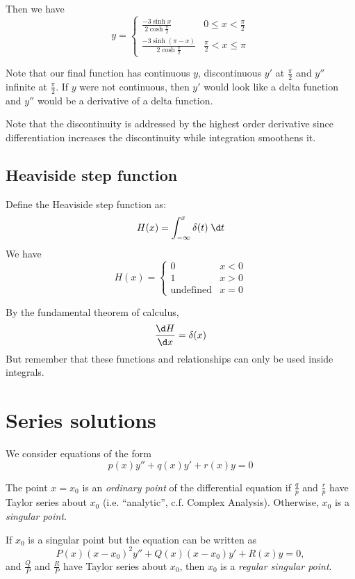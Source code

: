 \documentclass[a4paper]{article}
\begin{document}
Then we have 
\[
y =
\begin{cases}
  \frac{-3\sinh x}{2\cosh \frac{\pi}{2}} & 0 \leq x < \frac{\pi}{2}\\
  \frac{-3\sinh(\pi - x)}{2\cosh \frac{\pi}{2}} & \frac{\pi}{2} < x \leq \pi
\end{cases}
\]

Note that our final function has continuous $y$, discontinuous $y'$ at $\frac{\pi}{2}$ and $y''$ infinite at $\frac{\pi}{2}$. If $y$ were not continuous, then $y'$ would look like a delta function and $y''$ would be a derivative of a delta function.

Note that the discontinuity is addressed by the highest order derivative since differentiation increases the discontinuity while integration smoothens it.

\subsection{Heaviside step function}

\begin{defi}
  Define the Heaviside step function as:
  \[
  H(x) = \int_{-\infty}^x \delta(t) \;\d t
  \]
  We have
  \[
  H(x) =\begin{cases} 0 & x < 0\\1 & x > 0\\\text{undefined} & x = 0\end{cases}
  \]


By the fundamental theorem of calculus, 
\[
\frac{\d H}{\d x} = \delta(x)
\]
But remember that these functions and relationships can only be used inside integrals.
\end{defi}

\section{Series solutions}
We consider equations of the form 
\[
p(x) y'' + q(x) y' + r(x) y = 0
\]

\begin{defi}
  The point $x = x_0$ is an \emph{ordinary point} of the differential equation if $\frac{q}{p}$ and $\frac{r}{p}$ have Taylor series about $x_0$ (i.e. ``analytic'', c.f. Complex Analysis). Otherwise, $x_0$ is a \emph{singular point}.

If $x_0$ is a singular point but the equation can be written as
\[
P(x)(x - x_0)^2y'' + Q(x)(x - x_0)y' + R(x)y = 0,
\]
and $\frac{Q}{P}$ and $\frac{R}{P}$ have Taylor series about $x_0$, then $x_0$ is a \emph{regular singular point}.
\end{defi}
\end{document}
